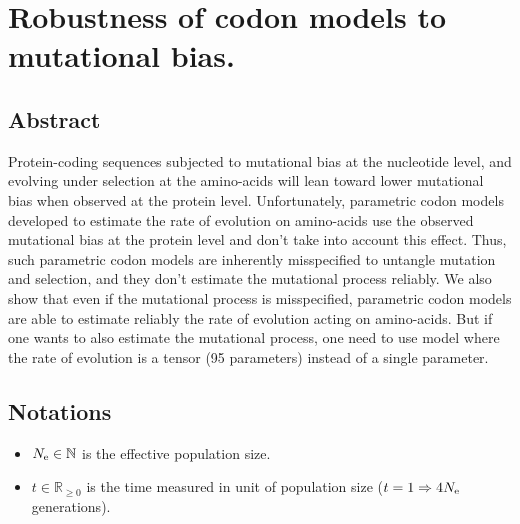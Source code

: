 \chapter{Robustness of codon models to mutational bias.}
{
	\hypersetup{linkcolor=GREYDARK}
	\minitoc
}
\section{Abstract}

Protein-coding sequences subjected to mutational bias at the nucleotide level, and evolving under selection at the amino-acids will lean toward lower mutational bias when observed at the protein level. Unfortunately, parametric codon models developed to estimate the rate of evolution on amino-acids use the observed mutational bias at the protein level and don't take into account this effect. Thus, such parametric codon models are inherently misspecified to untangle mutation and selection, and they don't estimate the mutational process reliably. We also show that even if the mutational process is misspecified, parametric codon models are able to estimate reliably the rate of evolution acting on amino-acids. But if one wants to also estimate the mutational process, one need to use model where the rate of evolution is a tensor (95 parameters) instead of a single parameter.

\section{Notations}

\begin{itemize}
	\item $N_{\textrm{e}} \in \mathbb{N}$ is the effective population size.
	\item $t \in \mathbb{R}_{\geq 0}$ is the time measured in unit of population size ($t=1 \Rightarrow 4 N_{\textrm{e}} $ generations).
\end{itemize}

